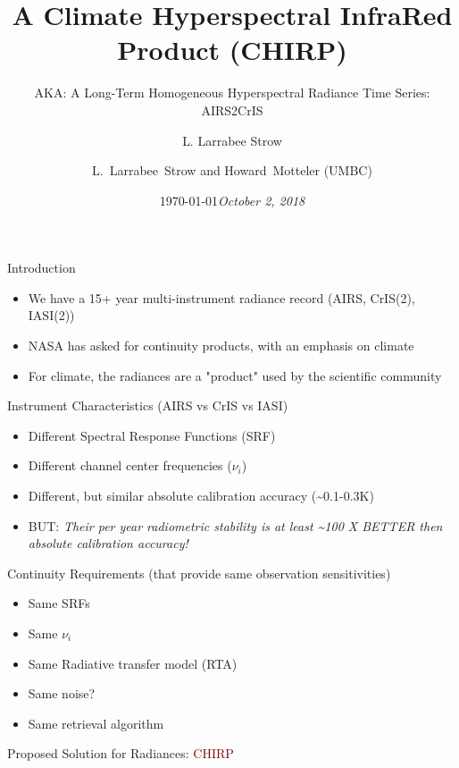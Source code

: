 \documentclass[10pt,t]{beamer}
\author{L. Larrabee Strow}
\date{\today}
\title{\large A Climate Hyperspectral InfraRed Product (CHIRP)}
\date{\textit{\footnotesize October 2, 2018}}
\subtitle{\footnotesize AKA:  A Long-Term Homogeneous Hyperspectral Radiance Time Series: AIRS2CrIS}
\author{L.~Larrabee~Strow and Howard~Motteler (UMBC)}
\begin{document}
\maketitle
{}

\begin{frame}[shrink=20,label={sec:orga583e20}]{Introduction}
\vspace{-0.1in}

\begin{itemize}
\item We have a 15+ year multi-instrument radiance record (AIRS, CrIS(2), IASI(2))
\item NASA has asked for continuity products, with an emphasis on climate
\item For climate, the radiances are a "product" used by the scientific community
\end{itemize}
\begin{block}{Instrument Characteristics (AIRS vs CrIS vs IASI)}
\begin{itemize}
\item Different Spectral Response Functions (SRF)
\item Different channel center frequencies (\(\nu_i\))
\item Different, but similar absolute calibration accuracy (\textasciitilde{}0.1-0.3K)
\item BUT: \emph{Their per year radiometric stability is at least \textasciitilde{}100 X \alert{BETTER} then absolute calibration accuracy!}
\end{itemize}
\end{block}
\begin{block}{Continuity Requirements (that provide same observation sensitivities)}
\begin{itemize}
\item Same SRFs
\item Same \(\nu_i\)
\item Same Radiative transfer model (RTA)
\item Same noise?
\item Same retrieval algorithm
\end{itemize}

\large Proposed Solution for Radiances: \textcolor{maroon}{CHIRP}
\end{block}
\end{frame}
\end{document}
